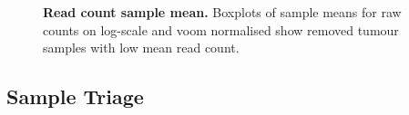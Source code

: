 \begin{figure}[!ht]
\begin{mdframed}
         \begin{center}
%
%
    \end{center}
  \caption[Read count sample mean]{\small \textbf{Read count sample mean.} Boxplots of sample means for raw counts on log-scale and voom normalised show removed tumour samples with low mean read count.}
\label{fig:boxplot}
\end{mdframed}
\end{figure}


\subsection{Sample Triage} \label{methods:sample_qc}


